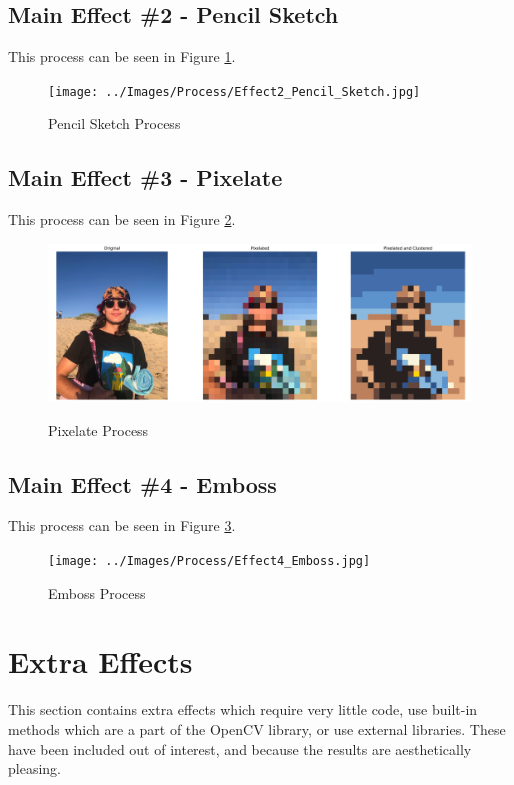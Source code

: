 \documentclass[a4paper,twoside,10pt, twocolumn]{report}
\begin{document}
	
	\subsection{Main Effect \#2 - Pencil Sketch}
	
	
	This process can be seen in Figure \ref{Process_Pencil_Sketch}.
	
	\begin{figure}[h]
		\caption{Pencil Sketch Process}
		\centering
		\texttt{[image: ../Images/Process/Effect2\_Pencil\_Sketch.jpg]}
		\label{Process_Pencil_Sketch}
	\end{figure}
	
	
	
	\subsection{Main Effect \#3 - Pixelate}
	This process can be seen in Figure \ref{Process_Pixelate}.
	
	\begin{figure}[h]
		\caption{Pixelate Process}
		\centering
		\includegraphics[width=\linewidth]{../Images/Process/Effect3_Pixelate.jpg}
		\label{Process_Pixelate}
	\end{figure}
	
	
	
	
	\subsection{Main Effect \#4 - Emboss}

	This process can be seen in Figure \ref{Process_Emboss}.
	
	\begin{figure}[h]
		\caption{Emboss Process}
		\centering
		\texttt{[image: ../Images/Process/Effect4\_Emboss.jpg]}
		\label{Process_Emboss}
	\end{figure}
	
	
	
	
	\section{Extra Effects}
	This section contains extra effects which require very little code, use built-in methods which are a part of the OpenCV library, or use external libraries. These have been included out of interest, and because the results are aesthetically pleasing.
\end{document}
